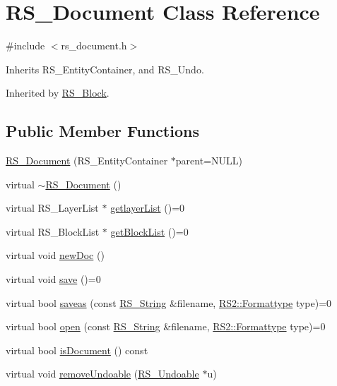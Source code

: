 \hypertarget{class_r_s___document}{\section{R\-S\-\_\-\-Document Class Reference}
\label{class_r_s___document}
}


{\ttfamily \#include $<$rs\-\_\-document.\-h$>$}



Inherits R\-S\-\_\-\-Entity\-Container, and R\-S\-\_\-\-Undo.



Inherited by \hyperlink{class_r_s___block}{R\-S\-\_\-\-Block}.

\subsection*{Public Member Functions}
\begin{DoxyCompactItemize}
\item 
\hyperlink{class_r_s___document_ad4f493b59861514e06835437d83fae7e}{R\-S\-\_\-\-Document} (R\-S\-\_\-\-Entity\-Container $\ast$parent=N\-U\-L\-L)
\item 
virtual \hyperlink{class_r_s___document_a4cd7e1358090e012e2137838998cadf5}{$\sim$\-R\-S\-\_\-\-Document} ()
\item 
virtual R\-S\-\_\-\-Layer\-List $\ast$ \hyperlink{class_r_s___document_a2e5e7df8bf442fcf974b4b421474c425}{getlayer\-List} ()=0
\item 
virtual R\-S\-\_\-\-Block\-List $\ast$ \hyperlink{class_r_s___document_a03a5d6a959d006c53d003401ffd19980}{get\-Block\-List} ()=0
\item 
virtual void \hyperlink{class_r_s___document_a61e811dfa86c21f4da611e61629eb3ce}{new\-Doc} ()
\item 
virtual void \hyperlink{class_r_s___document_a63dba2c9a69e3144ba2c15ed54b4e67c}{save} ()=0
\item 
virtual bool \hyperlink{class_r_s___document_ae3a203c242ebef71e33d860508567b3a}{saveas} (const \hyperlink{rs__string_8h_a5adec11f318c2ae2ecdc6fe2b03be9fa}{R\-S\-\_\-\-String} \&filename, \hyperlink{class_r_s2_ab876c252f8508d8947bb85cbbdd95b91}{R\-S2\-::\-Formattype} type)=0
\item 
virtual bool \hyperlink{class_r_s___document_a7acc1d006958a934ca14ff752ab2b731}{open} (const \hyperlink{rs__string_8h_a5adec11f318c2ae2ecdc6fe2b03be9fa}{R\-S\-\_\-\-String} \&filename, \hyperlink{class_r_s2_ab876c252f8508d8947bb85cbbdd95b91}{R\-S2\-::\-Formattype} type)=0
\item 
virtual bool \hyperlink{class_r_s___document_a3993bf1dd82399ec1b34c358ff153dba}{is\-Document} () const 
\item 
virtual void \hyperlink{class_r_s___document_af8dfb197c811c4a0655499447d3e9a82}{remove\-Undoable} (\hyperlink{class_r_s___undoable}{R\-S\-\_\-\-Undoable} $\ast$u)
\end{DoxyCompactItemize}


